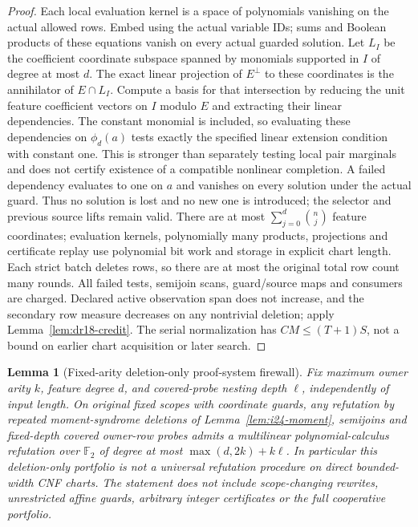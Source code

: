 \documentclass[11pt]{article}
\newtheorem{lemma}[theorem]{Lemma}
\begin{document}
\begin{proof}
Each local evaluation kernel is a space of polynomials vanishing on the actual allowed rows. Embed using the actual variable IDs; sums and Boolean products of these equations vanish on every actual guarded solution. Let $L_I$ be the coefficient coordinate subspace spanned by monomials supported in $I$ of degree at most $d$. The exact linear projection of $E^\perp$ to these coordinates is the annihilator of $E\cap L_I$. Compute a basis for that intersection by reducing the unit feature coefficient vectors on $I$ modulo $E$ and extracting their linear dependencies. The constant monomial is included, so evaluating these dependencies on $\phi_d(a)$ tests exactly the specified linear extension condition with constant one. This is stronger than separately testing local pair marginals and does not certify existence of a compatible nonlinear completion. A failed dependency evaluates to one on $a$ and vanishes on every solution under the actual guard. Thus no solution is lost and no new one is introduced; the selector and previous source lifts remain valid. There are at most $\sum_{j=0}^d\binom nj$ feature coordinates; evaluation kernels, polynomially many products, projections and certificate replay use polynomial bit work and storage in explicit chart length. Each strict batch deletes rows, so there are at most the original total row count many rounds. All failed tests, semijoin scans, guard/source maps and consumers are charged. Declared active observation span does not increase, and the secondary row measure decreases on any nontrivial deletion; apply Lemma~\ref{lem:dr18-credit}. The serial normalization has $CM\le(T+1)S$, not a bound on earlier chart acquisition or later search.
\end{proof}
\begin{lemma}[Fixed-arity deletion-only proof-system firewall]\label{lem:i24-firewall}
Fix maximum owner arity $k$, feature degree $d$, and covered-probe nesting depth $\ell$, independently of input length. On original fixed scopes with coordinate guards, any refutation by repeated moment-syndrome deletions of Lemma~\ref{lem:i24-moment}, semijoins and fixed-depth covered owner-row probes admits a multilinear polynomial-calculus refutation over $\mathbb F_2$ of degree at most $\max(d,2k)+k\ell$. In particular this deletion-only portfolio is not a universal refutation procedure on direct bounded-width CNF charts. The statement does not include scope-changing rewrites, unrestricted affine guards, arbitrary integer certificates or the full cooperative portfolio.
\end{lemma}
\end{document}
